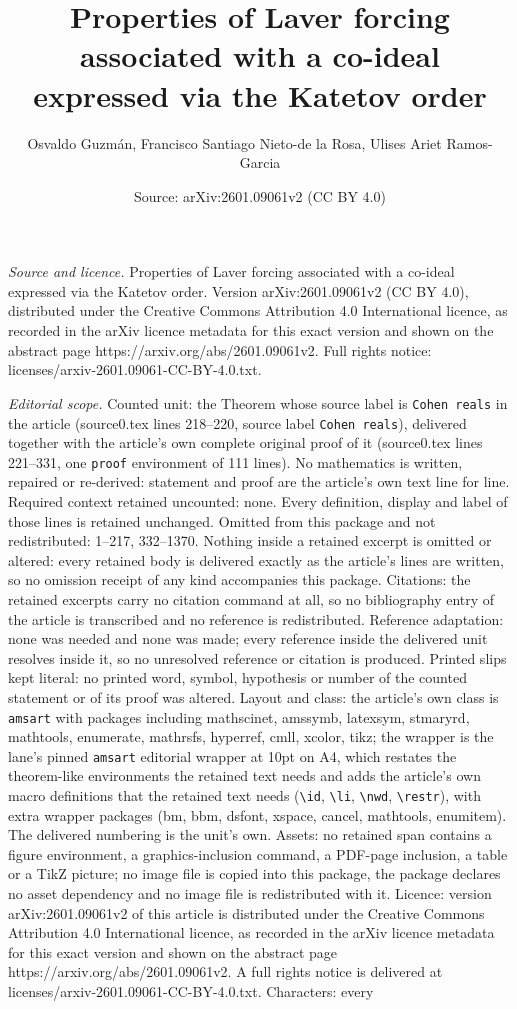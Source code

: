 \documentclass[10pt,a4paper]{amsart}
\title[Properties of Laver forcing associated with a co-ideal expre]{Properties of Laver forcing associated with a co-ideal expressed via the Katetov order}
\author{Osvaldo Guzm\'an, Francisco Santiago Nieto-de la Rosa, Ulises Ariet Ramos-Garcia}
\date{Source: arXiv:2601.09061v2 (CC BY 4.0)}
\begin{document}
\maketitle

\noindent\emph{Source and licence.} Properties of Laver forcing associated with a co-ideal expressed via the Katetov order. Version arXiv:2601.09061v2 (CC BY 4.0), distributed under the Creative Commons Attribution 4.0 International licence, as recorded in the arXiv licence metadata for this exact version and shown on the abstract page https://arxiv.org/abs/2601.09061v2. Full rights notice: licenses/arxiv-2601.09061-CC-BY-4.0.txt.\par\smallskip

\noindent\textit{Editorial scope.} Counted unit: the Theorem whose source label is \texttt{Cohen reals} in the article (source0.tex lines 218--220, source label \texttt{Cohen reals}), delivered together with the article's own complete original proof of it (source0.tex lines 221--331, one \texttt{proof} environment of 111 lines). No mathematics is written, repaired or re-derived: statement and proof are the article's own text line for line. Required context retained uncounted: none. Every definition, display and label of those lines is retained unchanged. Omitted from this package and not redistributed: 1--217, 332--1370. Nothing inside a retained excerpt is omitted or altered: every retained body is delivered exactly as the article's lines are written, so no omission receipt of any kind accompanies this package. Citations: the retained excerpts carry no citation command at all, so no bibliography entry of the article is transcribed and no reference is redistributed. Reference adaptation: none was needed and none was made; every reference inside the delivered unit resolves inside it, so no unresolved reference or citation is produced. Printed slips kept literal: no printed word, symbol, hypothesis or number of the counted statement or of its proof was altered. Layout and class: the article's own class is \texttt{amsart} with packages including mathscinet, amssymb, latexsym, stmaryrd, mathtools, enumerate, mathrsfs, hyperref, cmll, xcolor, tikz; the wrapper is the lane's pinned \texttt{amsart} editorial wrapper at 10pt on A4, which restates the theorem-like environments the retained text needs and adds the article's own macro definitions that the retained text needs (\texttt{\textbackslash id}, \texttt{\textbackslash li}, \texttt{\textbackslash nwd}, \texttt{\textbackslash restr}), with extra wrapper packages (bm, bbm, dsfont, xspace, cancel, mathtools, enumitem). The delivered numbering is the unit's own. Assets: no retained span contains a figure environment, a graphics-inclusion command, a PDF-page inclusion, a table or a TikZ picture; no image file is copied into this package, the package declares no asset dependency and no image file is redistributed with it. Licence: version arXiv:2601.09061v2 of this article is distributed under the Creative Commons Attribution 4.0 International licence, as recorded in the arXiv licence metadata for this exact version and shown on the abstract page https://arxiv.org/abs/2601.09061v2. A full rights notice is delivered at licenses/arxiv-2601.09061-CC-BY-4.0.txt. Characters: every 
\end{document}
